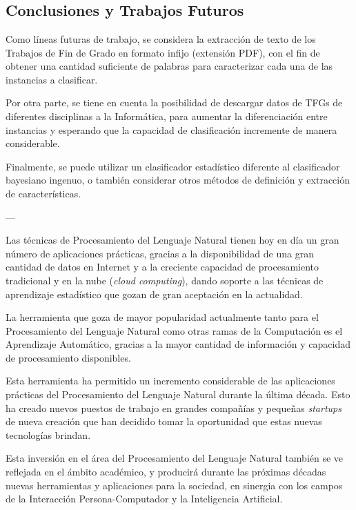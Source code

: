\chapter{\ChapterFour{}}

\section{Conclusiones y Trabajos Futuros}

Como líneas futuras de trabajo, se considera la extracción de texto de los Trabajos de Fin de Grado en formato infijo (extensión PDF), con el fin de obtener una cantidad suficiente de palabras para caracterizar cada una de las instancias a clasificar.

Por otra parte, se tiene en cuenta la posibilidad de descargar datos de TFGs de diferentes disciplinas a la Informática, para aumentar la diferenciación entre instancias y esperando que la capacidad de clasificación incremente de manera considerable.

Finalmente, se puede utilizar un clasificador estadístico diferente al clasificador bayesiano ingenuo, o también considerar otros métodos de definición y extracción de características.

---

Las técnicas de Procesamiento del Lenguaje Natural tienen hoy en día un gran número de aplicaciones prácticas, gracias a la disponibilidad de una gran cantidad de datos en Internet y a la creciente capacidad de procesamiento tradicional y en la nube (\textit{cloud computing}), dando soporte a las técnicas de aprendizaje estadístico que gozan de gran aceptación en la actualidad.

La herramienta que goza de mayor popularidad actualmente tanto para el Procesamiento del Lenguaje Natural como otras ramas de la Computación es el Aprendizaje Automático, gracias a la mayor cantidad de información y capacidad de procesamiento disponibles.

Esta herramienta ha permitido un incremento considerable de las aplicaciones prácticas del Procesamiento del Lenguaje Natural durante la última década. Esto ha creado nuevos puestos de trabajo en grandes compañías y pequeñas \textit{startups} de nueva creación que han decidido tomar la oportunidad que estas nuevas tecnologías brindan.

Esta inversión en el área del Procesamiento del Lenguaje Natural también se ve reflejada en el ámbito académico, y producirá durante las próximas décadas nuevas herramientas y aplicaciones para la sociedad, en sinergia con los campos de la Interacción Persona-Computador y la Inteligencia Artificial.

